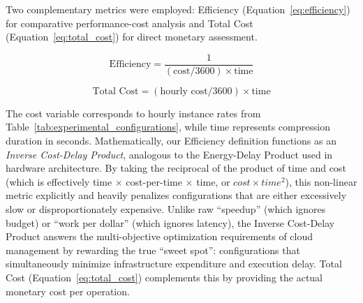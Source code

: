 \documentclass[conference]{IEEEtran}
\begin{document}
	Two complementary metrics were employed: Efficiency (Equation~\ref{eq:efficiency}) for comparative performance-cost analysis and Total Cost (Equation~\ref{eq:total_cost}) for direct monetary assessment.
	
	\begin{equation}
		\text{Efficiency} = \frac{1}{(\text{cost}/3600) \times \text{time}}
		\label{eq:efficiency}
	\end{equation}
	
	\begin{equation}
		\text{Total Cost} = (\text{hourly cost}/3600) \times \text{time}
		\label{eq:total_cost}
	\end{equation}
	
	The cost variable corresponds to hourly instance rates from Table~\ref{tab:experimental_configurations}, while time represents compression duration in seconds. Mathematically, our Efficiency definition functions as an \textit{Inverse Cost-Delay Product}, analogous to the Energy-Delay Product used in hardware architecture. By taking the reciprocal of the product of time and cost (which is effectively time $\times$ cost-per-time $\times$ time, or $cost \times time^2$), this non-linear metric explicitly and heavily penalizes configurations that are either excessively slow or disproportionately expensive. Unlike raw ``speedup'' (which ignores budget) or ``work per dollar'' (which ignores latency), the Inverse Cost-Delay Product answers the multi-objective optimization requirements of cloud management by rewarding the true ``sweet spot'': configurations that simultaneously minimize infrastructure expenditure and execution delay. Total Cost (Equation~\ref{eq:total_cost}) complements this by providing the actual monetary cost per operation.
	
\end{document}
